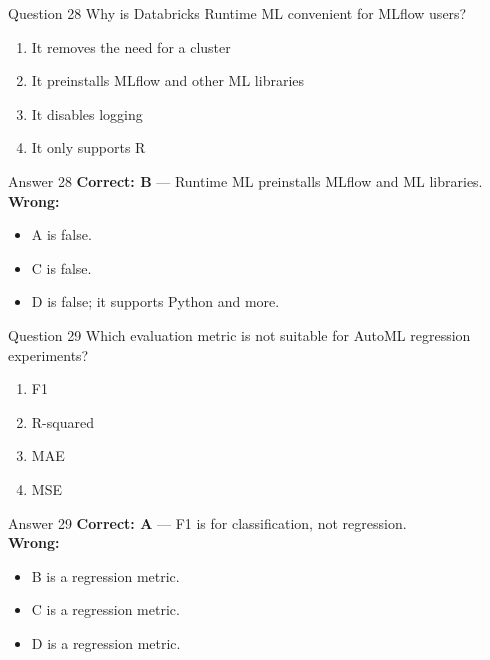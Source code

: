 \documentclass[aspectratio=169,11pt]{beamer}
\begin{document}
	\begin{frame}{Question 28}
		Why is Databricks Runtime ML convenient for MLflow users?
		\begin{enumerate}[label=\Alph*.]
			\item It removes the need for a cluster
			\item It preinstalls MLflow and other ML libraries
			\item It disables logging
			\item It only supports R
		\end{enumerate}
	\end{frame}
	\begin{frame}{Answer 28}
		\textbf{Correct: B} --- Runtime ML preinstalls MLflow and ML libraries.\\
		\vspace{0.5em}
		\textbf{Wrong:}
		\begin{itemize}
			\item A is false.
			\item C is false.
			\item D is false; it supports Python and more.
		\end{itemize}
	\end{frame}
	
	\begin{frame}{Question 29}
		Which evaluation metric is not suitable for AutoML regression experiments?
		\begin{enumerate}[label=\Alph*.]
			\item F1
			\item R-squared
			\item MAE
			\item MSE
		\end{enumerate}
	\end{frame}
	\begin{frame}{Answer 29}
		\textbf{Correct: A} --- F1 is for classification, not regression.\\
		\vspace{0.5em}
		\textbf{Wrong:}
		\begin{itemize}
			\item B is a regression metric.
			\item C is a regression metric.
			\item D is a regression metric.
		\end{itemize}
	\end{frame}
	
\end{document}
